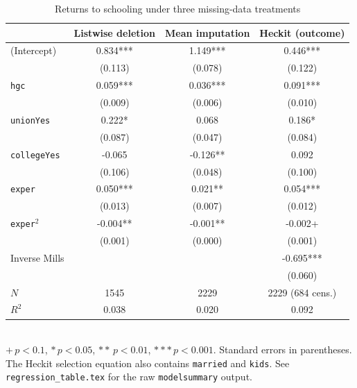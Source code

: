 \documentclass[11pt]{article}
\begin{document}
\begin{table}[h]
    \centering
    \caption{Returns to schooling under three missing-data treatments}
    \label{tab:reg}
    \begin{tabular}{lccc}
        \toprule
        & Listwise deletion & Mean imputation & Heckit (outcome) \\
        \midrule
        (Intercept)        &  0.834***  &  1.149***  &  0.446***  \\
                           & (0.113)    & (0.078)    & (0.122)    \\
        \texttt{hgc}       &  0.059***  &  0.036***  &  0.091***  \\
                           & (0.009)    & (0.006)    & (0.010)    \\
        \texttt{unionYes}  &  0.222*    &  0.068     &  0.186*    \\
                           & (0.087)    & (0.047)    & (0.084)    \\
        \texttt{collegeYes}& -0.065     & -0.126**   &  0.092     \\
                           & (0.106)    & (0.048)    & (0.100)    \\
        \texttt{exper}     &  0.050***  &  0.021**   &  0.054***  \\
                           & (0.013)    & (0.007)    & (0.012)    \\
        \texttt{exper}$^2$ & -0.004**   & -0.001**   & -0.002+    \\
                           & (0.001)    & (0.000)    & (0.001)    \\
        Inverse Mills      &            &            & -0.695***  \\
                           &            &            & (0.060)    \\
        \midrule
        $N$                & 1545     & 2229     & 2229 (684 cens.) \\
        $R^2$              & 0.038    & 0.020    & 0.092    \\
        \bottomrule
    \end{tabular}\\[2pt]
    \footnotesize{$+\,p<0.1$, $*\,p<0.05$, $**\,p<0.01$, $***\,p<0.001$.
    Standard errors in parentheses.  The Heckit selection equation also
    contains \texttt{married} and \texttt{kids}.  See \texttt{regression\_table.tex}
    for the raw \texttt{modelsummary} output.}
\end{table}
\end{document}

